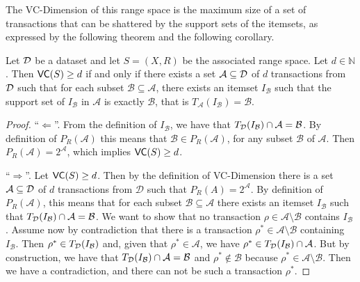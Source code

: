 The VC-Dimension of this range space is the maximum size of a set of
transactions that can be shattered by the support sets of the itemsets, as
expressed by the following theorem and the following corollary.

\begin{theorem}
  Let ${\cal D}$ be a dataset and let $S=(X,R)$ be the associated range
  space. Let $d\in\mathbb{N}$. Then $\mathsf{VC}(S)\ge d$ if and only if there exists a
  set $\mathcal{A}\subseteq{\cal D}$ of $d$ transactions from ${\cal D}$ such that for
  each subset $\mathcal{B}\subseteq\mathcal{A}$, there exists an itemset
  $I_\mathcal{B}$ such that the support set
  of $I_\mathcal{B}$ in $\mathcal{A}$ is exactly $\mathcal{B}$, that is
  $T_\mathcal{A}(I_\mathcal{B})=\mathcal{B}$.
\end{theorem}

\begin{proof} ``$\Leftarrow$''.
  From the definition of $I_\mathcal{B}$, we have that
  $T_{\cal D}(I_\mathcal{B})\cap\mathcal{A}=\mathcal{B}$. By definition of
  $P_R(\mathcal{A})$ this means that $\mathcal{B}\in P_R(\mathcal{A})$, for any
  subset $\mathcal{B}$ of $\mathcal{A}$. Then $P_R(\mathcal{A})=2^\mathcal{A}$,
  which implies $\mathsf{VC}(S)\ge d$.

  ``$\Rightarrow$''. Let $\mathsf{VC}(S)\ge d$. Then by the definition of VC-Dimension there
  is a set $\mathcal{A}\subseteq{\cal D}$ of $d$ transactions from $\mathcal{D}$ such
  that $P_R(A)=2^{\mathcal{A}}$. By definition of $P_R(\mathcal{A})$, this means
  that for each subset $\mathcal{B}\subseteq\mathcal{A}$ there exists an itemset
  $I_\mathcal{B}$ such that $T_{\cal D}(I_\mathcal{B})\cap\mathcal{A}=\mathcal{B}$.
  We want to show that no transaction $\rho\in\mathcal{A}\setminus\mathcal{B}$
  contains $I_\mathcal{B}$. Assume now by contradiction that there is a
  transaction $\rho^*\in\mathcal{A}\setminus\mathcal{B}$ containing
  $I_\mathcal{B}$. Then $\rho^*\in T_{\cal D}(I_\mathcal{B})$ and, given that
  $\rho^*\in\mathcal{A}$, we have $\rho^*\in
  T_{\cal D}(I_\mathcal{B})\cap\mathcal{A}$. But by construction, we have that
  $T_{\cal D}(I_\mathcal{B})\cap\mathcal{A}=\mathcal{B}$ and
  $\rho^*\notin\mathcal{B}$ because $\rho^*\in\mathcal{A}\setminus\mathcal{B}$.
  Then we have a contradiction, and there can not be such a transaction
  $\rho^*$.
\end{proof}

